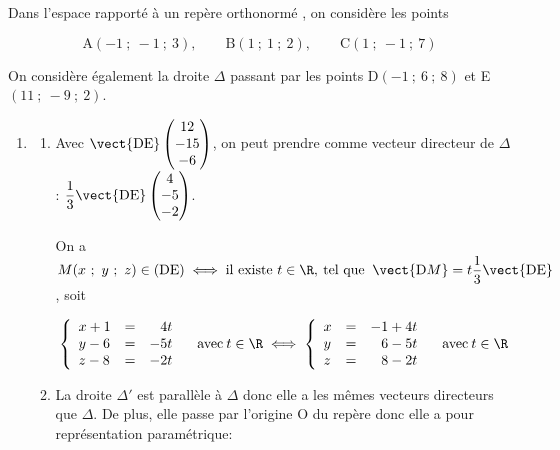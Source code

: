 
\medskip

Dans l'espace rapporté à un repère orthonormé \Oijk, on considère les points

\[\text{A}(-1~;~-1~;~3),\qquad \text{B}(1~;~1~;~2),\qquad  \text{C}(1~;~-1~;~7)\]

On considère également la droite $\Delta$ passant par les points D$(-1~;~6~;~8)$ et E$(11~;~- 9~;~2)$.

\medskip

\begin{enumerate}
\item 
	\begin{enumerate}
		\item %
		
Avec $\vect{\text{DE}}\begin{pmatrix}12\\-15\\-6\end{pmatrix}$, on peut prendre comme vecteur directeur de $\Delta$:
$\dfrac13\vect{\text{DE}}\begin{pmatrix}4\\-5\\-2\end{pmatrix}$.

On a  $M(x~;~y~;~z) \in (\text{DE}) \iff \text{il existe } t \in \R, \: \text{tel que } \: \vect{\text{D}M} = t \dfrac13\vect{\text{DE}}$, soit 

\[\left\{\begin{array}{l c r}
x + 1 &=& 4t\\
y - 6 &=&-5t\\
z - 8 &=& -2t
\end{array}\right. \quad\text{avec}\: t \in \R
\iff 
\left\{\begin{array}{l c l}
x &=& -1 + 4t\\
y &=& \phantom{-}6 - 5t \\
z &=& \phantom{-}8 - 2t
\end{array}\right. \quad\text{avec}\: t \in \R\]
		\item La droite $\Delta'$ est parallèle à $\Delta$ donc elle a les mêmes vecteurs directeurs que $\Delta$. De plus, elle passe par l'origine O du repère donc elle a pour représentation paramétrique:


\end{enumerate}
\end{enumerate}
